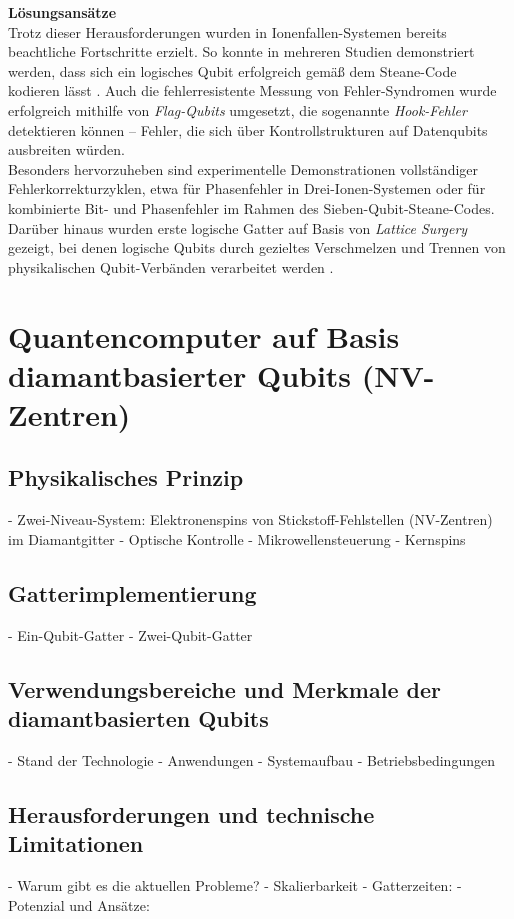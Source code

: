 \textbf{Lösungsansätze} \\
Trotz dieser Herausforderungen wurden in Ionenfallen-Systemen bereits beachtliche Fortschritte erzielt. So konnte in mehreren Studien demonstriert werden, dass sich ein logisches Qubit erfolgreich gemäß dem Steane-Code kodieren lässt \cite{strohm2024}. Auch die fehlerresistente Messung von Fehler-Syndromen wurde erfolgreich mithilfe von \textit{Flag-Qubits} umgesetzt, die sogenannte \textit{Hook-Fehler} detektieren können – Fehler, die sich über Kontrollstrukturen auf Datenqubits ausbreiten würden. \\

Besonders hervorzuheben sind experimentelle Demonstrationen vollständiger Fehlerkorrekturzyklen, etwa für Phasenfehler in Drei-Ionen-Systemen oder für kombinierte Bit- und Phasenfehler im Rahmen des Sieben-Qubit-Steane-Codes. Darüber hinaus wurden erste logische Gatter auf Basis von \textit{Lattice Surgery} gezeigt, bei denen logische Qubits durch gezieltes Verschmelzen und Trennen von physikalischen Qubit-Verbänden verarbeitet werden \cite{strohm2024}.

\section{Quantencomputer auf Basis diamantbasierter Qubits (NV-Zentren)}
\subsection{Physikalisches Prinzip}
    - Zwei-Niveau-System: Elektronenspins von Stickstoff-Fehlstellen (NV-Zentren) im Diamantgitter
    - Optische Kontrolle
    - Mikrowellensteuerung
    - Kernspins
\subsection{Gatterimplementierung}
    - Ein-Qubit-Gatter
    - Zwei-Qubit-Gatter
\subsection{Verwendungsbereiche und Merkmale der diamantbasierten Qubits}
    - Stand der Technologie
    - Anwendungen
    - Systemaufbau
    - Betriebsbedingungen
\subsection{Herausforderungen und technische Limitationen}
    - Warum gibt es die aktuellen Probleme?
    - Skalierbarkeit
    - Gatterzeiten:
    - Potenzial und Ansätze:



